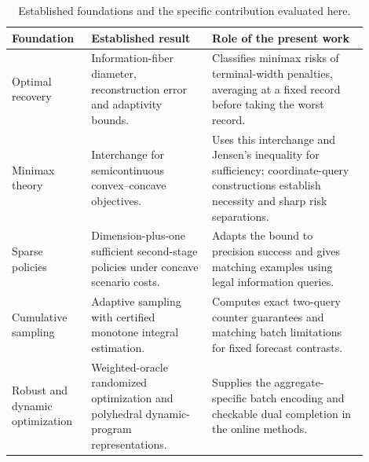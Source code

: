 \begin{table}[htbp]
\centering\small
\caption{Established foundations and the specific contribution evaluated here.}
\label{tab:prior-art-boundary}
\begin{tabular}{>{\raggedright\arraybackslash}p{0.19\linewidth}>{\raggedright\arraybackslash}p{0.31\linewidth}>{\raggedright\arraybackslash}p{0.40\linewidth}}
\toprule
Foundation & Established result & Role of the present work\\
\midrule
Optimal recovery \citep{novak2008,krieg2025,krieg2026}
& Information-fiber diameter, reconstruction error and adaptivity bounds.
& Classifies minimax risks of terminal-width penalties, averaging at a fixed
record before taking the worst record.\\
Minimax theory \citep{sion1958}
& Interchange for semicontinuous convex--concave objectives.
& Uses this interchange and Jensen's inequality for sufficiency; coordinate-query
constructions establish necessity and sharp risk separations.\\
Sparse policies \citep{kurtz2026}
& Dimension-plus-one sufficient second-stage policies under concave scenario costs.
& Adapts the bound to precision success and gives matching examples using legal
information queries.\\
Cumulative sampling \citep{gaillard2023}
& Adaptive sampling with certified monotone integral estimation.
& Computes exact two-query counter guarantees and matching batch limitations
for fixed forecast contrasts.\\
Robust and dynamic optimization \citep{kawase2024,martin1990}
& Weighted-oracle randomized optimization and polyhedral dynamic-program
representations.
& Supplies the aggregate-specific batch encoding and checkable dual completion
in the online methods.\\
\bottomrule
\end{tabular}
\end{table}
